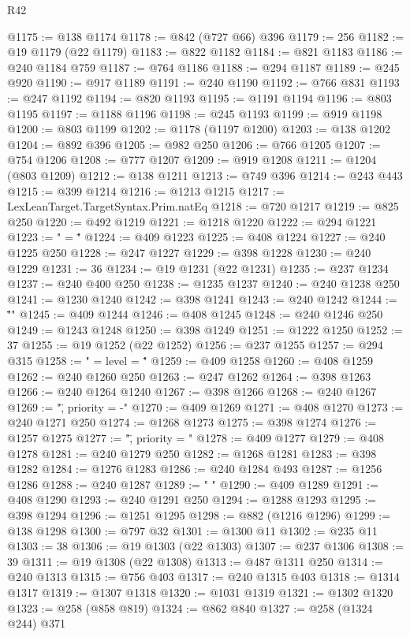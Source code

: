\begin{lexlean}{R42}
\begin{coremodule}
@1175 := @138 @1174
@1178 := @842 (@727 @66) @396
@1179 := 256
@1182 := @19 @1179 (@22 @1179)
@1183 := @822 @1182
@1184 := @821 @1183
@1186 := @240 @1184 @759
@1187 := @764 @1186
@1188 := @294 @1187
@1189 := @245 @920
@1190 := @917 @1189
@1191 := @240 @1190
@1192 := @766 @831
@1193 := @247 @1192
@1194 := @820 @1193
@1195 := @1191 @1194
@1196 := @803 @1195
@1197 := @1188 @1196
@1198 := @245 @1193
@1199 := @919 @1198
@1200 := @803 @1199
@1202 := @1178 (@1197 @1200)
@1203 := @138 @1202
@1204 := @892 @396
@1205 := @982 @250
@1206 := @766 @1205
@1207 := @754 @1206
@1208 := @777 @1207
@1209 := @919 @1208
@1211 := @1204 (@803 @1209)
@1212 := @138 @1211
@1213 := @749 @396
@1214 := @243 @443
@1215 := @399 @1214
@1216 := @1213 @1215
@1217 := LexLeanTarget.TargetSyntax.Prim.natEq
@1218 := @720 @1217
@1219 := @825 @250
@1220 := @492 @1219
@1221 := @1218 @1220
@1222 := @294 @1221
@1223 := " = \""
@1224 := @409 @1223
@1225 := @408 @1224
@1227 := @240 @1225 @250
@1228 := @247 @1227
@1229 := @398 @1228
@1230 := @240 @1229
@1231 := 36
@1234 := @19 @1231 (@22 @1231)
@1235 := @237 @1234
@1237 := @240 @400 @250
@1238 := @1235 @1237
@1240 := @240 @1238 @250
@1241 := @1230 @1240
@1242 := @398 @1241
@1243 := @240 @1242
@1244 := "\"\n"
@1245 := @409 @1244
@1246 := @408 @1245
@1248 := @240 @1246 @250
@1249 := @1243 @1248
@1250 := @398 @1249
@1251 := @1222 @1250
@1252 := 37
@1255 := @19 @1252 (@22 @1252)
@1256 := @237 @1255
@1257 := @294 @315
@1258 := " = { level = \""
@1259 := @409 @1258
@1260 := @408 @1259
@1262 := @240 @1260 @250
@1263 := @247 @1262
@1264 := @398 @1263
@1266 := @240 @1264 @1240
@1267 := @398 @1266
@1268 := @240 @1267
@1269 := "\", priority = -"
@1270 := @409 @1269
@1271 := @408 @1270
@1273 := @240 @1271 @250
@1274 := @1268 @1273
@1275 := @398 @1274
@1276 := @1257 @1275
@1277 := "\", priority = "
@1278 := @409 @1277
@1279 := @408 @1278
@1281 := @240 @1279 @250
@1282 := @1268 @1281
@1283 := @398 @1282
@1284 := @1276 @1283
@1286 := @240 @1284 @493
@1287 := @1256 @1286
@1288 := @240 @1287
@1289 := " }\n"
@1290 := @409 @1289
@1291 := @408 @1290
@1293 := @240 @1291 @250
@1294 := @1288 @1293
@1295 := @398 @1294
@1296 := @1251 @1295
@1298 := @882 (@1216 @1296)
@1299 := @138 @1298
@1300 := @797 @32
@1301 := @1300 @11
@1302 := @235 @11
@1303 := 38
@1306 := @19 @1303 (@22 @1303)
@1307 := @237 @1306
@1308 := 39
@1311 := @19 @1308 (@22 @1308)
@1313 := @487 @1311 @250
@1314 := @240 @1313
@1315 := @756 @403
@1317 := @240 @1315 @403
@1318 := @1314 @1317
@1319 := @1307 @1318
@1320 := @1031 @1319
@1321 := @1302 @1320
@1323 := @258 (@858 @819)
@1324 := @862 @840
@1327 := @258 (@1324 @244) @371

\end{coremodule}
\end{lexlean}
